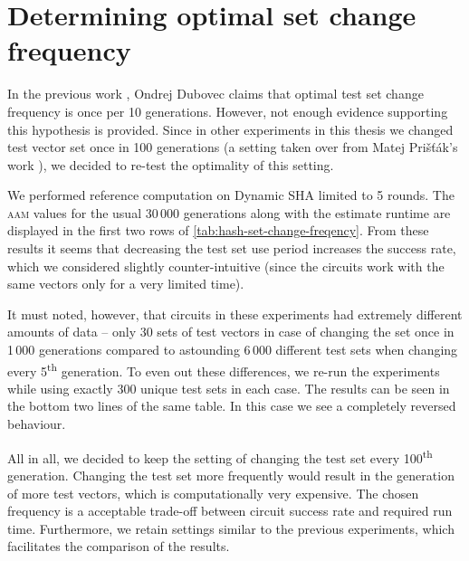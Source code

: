 \documentclass[12pt,twoside]{fithesis2}		%
\renewcommand{\_}{\leavevmode \kern0.0em\vbox{\hrule width0.4em}}
\begin{document}
\section{Determining optimal set change frequency}
\label{sec:hash-set-change-freqency}

In the previous work \parencite{thesis-dubovec}, Ondrej Dubovec claims that optimal test set change frequency is once
per 10 generations. However, not enough evidence supporting this hypothesis is provided. Since in other experiments in this thesis
we changed test vector set once in 100 generations (a setting taken over from Matej Prišťák's work \parencite{thesis-pristak}), 
we decided to re-test the optimality of this setting.

We performed reference computation on Dynamic SHA limited to 5 rounds. The \textsc{aam} values for the usual 30\,000 generations
along with the estimate runtime are displayed in the first two rows of \autoref{tab:hash-set-change-freqency}.
From these results it seems that decreasing the test set use period increases the success rate, which we considered slightly
counter-intuitive (since the circuits work with the same vectors only for a very limited time).

It must noted, however, that circuits in these experiments had extremely different amounts of data -- only 30 sets of test vectors
in case of changing the set once in 1\,000 generations compared to astounding 6\,000 different test sets when changing every 
5\textsuperscript{th} generation. To even out these differences, we re-run the experiments while using exactly 300 unique test sets
in each case. The results can be seen in the bottom two lines of the same table. In this case we see a completely reversed
behaviour.

All in all, we decided to keep the setting of changing the test set every 100\textsuperscript{th} generation.
Changing the test set more frequently would result in the generation of more test vectors, which is computationally very expensive.
The chosen frequency is a acceptable trade-off between circuit success rate and required run time. 
Furthermore, we retain settings similar to the previous experiments, which facilitates the comparison of the results.
\bigskip
\end{document}
